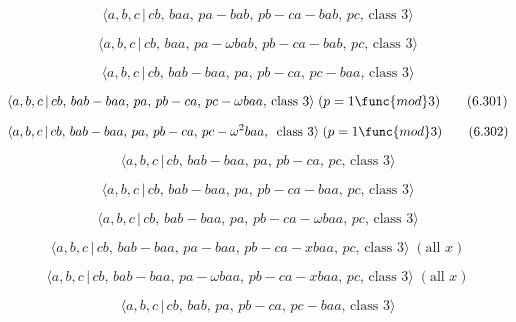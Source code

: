 \documentclass[10pt]{article}
\begin{document}
\begin{equation}
\langle a,b,c\,|\,cb,\,baa,\,pa-bab,\,pb-ca-bab,\,pc,\,\text{class }3\rangle
\tag{6.298}
\end{equation}

\begin{equation}
\langle a,b,c\,|\,cb,\,baa,\,pa-\omega bab,\,pb-ca-bab,\,pc,\,\text{class }%
3\rangle  \tag{6.299}
\end{equation}

\begin{equation}
\langle a,b,c\,|\,cb,\,bab-baa,\,pa,\,pb-ca,\,pc-baa,\,\text{class }3\rangle
\tag{6.300}
\end{equation}

\begin{equation}
\langle a,b,c\,|\,cb,\,bab-baa,\,pa,\,pb-ca,\,pc-\omega baa,\,\text{class }%
3\rangle\;(p=1 \func{mod} 3)  \tag{6.301}
\end{equation}

\begin{equation}
\langle a,b,c\,|\,cb,\,bab-baa,\,pa,\,pb-ca,\,pc-\omega ^2baa,\,\text{ class 
}3\rangle\;(p=1 \func{mod} 3)  \tag{6.302}
\end{equation}

\begin{equation}
\langle a,b,c\,|\,cb,\,bab-baa,\,pa,\,pb-ca,\,pc,\,\text{class }3\rangle 
\tag{6.303}
\end{equation}

\begin{equation}
\langle a,b,c\,|\,cb,\,bab-baa,\,pa,\,pb-ca-baa,\,pc,\,\text{class }3\rangle
\tag{6.304}
\end{equation}

\begin{equation}
\langle a,b,c\,|\,cb,\,bab-baa,\,pa,\,pb-ca-\omega baa,\,pc,\,\text{class }%
3\rangle  \tag{6.305}
\end{equation}

\begin{equation}
\langle a,b,c\,|\,cb,\,bab-baa,\,pa-baa,\,pb-ca-xbaa,\,pc,\,\text{class }%
3\rangle\;(\text{all }x)  \tag{6.305B}
\end{equation}

\begin{equation}
\langle a,b,c\,|\,cb,\,bab-baa,\,pa-\omega baa,\,pb-ca-xbaa,\,pc,\,\text{
class }3\rangle\;(\text{all }x)  \tag{6.305C}
\end{equation}

\begin{equation}
\langle a,b,c\,|\,cb,\,bab,\,pa,\,pb-ca,\,pc-baa,\,\text{class }3\rangle 
\tag{6.306}
\end{equation}
\end{document}
